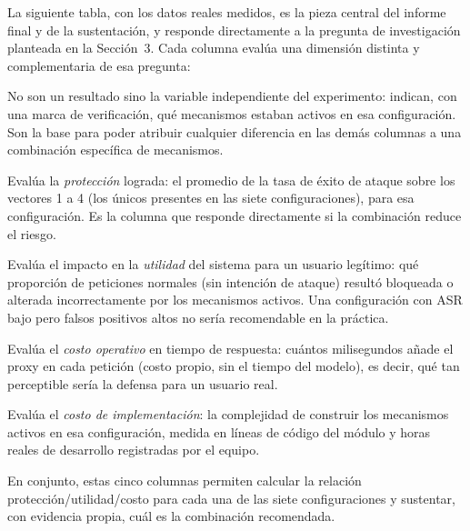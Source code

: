 \documentclass[11pt,letterpaper]{article}
\begin{document}
La siguiente tabla, con los datos reales medidos, es la pieza central del informe final y de la sustentación, y responde directamente a la pregunta de investigación planteada en la Sección~3. Cada columna evalúa una dimensión distinta y complementaria de esa pregunta:

\begin{description}[leftmargin=0.4cm, style=nextline, itemsep=3pt]
\item[\textbf{Filt., Del., Clas., M.P., A.H.}] No son un resultado sino la variable independiente del experimento: indican, con una marca de verificación, qué mecanismos estaban activos en esa configuración. Son la base para poder atribuir cualquier diferencia en las demás columnas a una combinación específica de mecanismos.
\item[\textbf{ASR prom.}] Evalúa la \emph{protección} lograda: el promedio de la tasa de éxito de ataque sobre los vectores 1 a 4 (los únicos presentes en las siete configuraciones), para esa configuración. Es la columna que responde directamente si la combinación reduce el riesgo.
\item[\textbf{Falsos pos.}] Evalúa el impacto en la \emph{utilidad} del sistema para un usuario legítimo: qué proporción de peticiones normales (sin intención de ataque) resultó bloqueada o alterada incorrectamente por los mecanismos activos. Una configuración con ASR bajo pero falsos positivos altos no sería recomendable en la práctica.
\item[\textbf{Latencia extra}] Evalúa el \emph{costo operativo} en tiempo de respuesta: cuántos milisegundos añade el proxy en cada petición (costo propio, sin el tiempo del modelo), es decir, qué tan perceptible sería la defensa para un usuario real.
\item[\textbf{Costo (líneas/h)}] Evalúa el \emph{costo de implementación}: la complejidad de construir los mecanismos activos en esa configuración, medida en líneas de código del módulo y horas reales de desarrollo registradas por el equipo.
\end{description}

En conjunto, estas cinco columnas permiten calcular la relación protección/utilidad/costo para cada una de las siete configuraciones y sustentar, con evidencia propia, cuál es la combinación recomendada.
\end{document}

